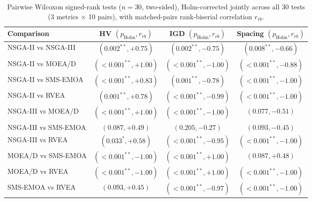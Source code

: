 \begin{table}[tbp]
\centering
\caption{Pairwise Wilcoxon signed-rank tests ($n=30$, two-sided), Holm-corrected jointly across all 30 tests (3 metrics $\times$ 10 pairs), with matched-pairs rank-biserial correlation $r_{rb}$.}
\label{tab:wilcoxon}
\small
\setlength{\tabcolsep}{4pt}
\begin{tabular}{lccc}
\toprule
Comparison & HV $(p_{\mathrm{Holm}}, r_{rb})$ & IGD $(p_{\mathrm{Holm}}, r_{rb})$ & Spacing $(p_{\mathrm{Holm}}, r_{rb})$ \\
\midrule
NSGA-II vs NSGA-III & $(0.002^{**}, +0.75)$ & $(0.002^{**}, -0.75)$ & $(0.008^{**}, -0.66)$ \\
NSGA-II vs MOEA/D & $(<0.001^{**}, +1.00)$ & $(<0.001^{**}, -1.00)$ & $(<0.001^{**}, -0.88)$ \\
NSGA-II vs SMS-EMOA & $(<0.001^{**}, +0.83)$ & $(0.001^{**}, -0.78)$ & $(<0.001^{**}, -1.00)$ \\
NSGA-II vs RVEA & $(0.001^{**}, +0.78)$ & $(<0.001^{**}, -0.99)$ & $(<0.001^{**}, -1.00)$ \\
NSGA-III vs MOEA/D & $(<0.001^{**}, +1.00)$ & $(<0.001^{**}, -1.00)$ & $(0.077, -0.51)$ \\
NSGA-III vs SMS-EMOA & $(0.087, +0.49)$ & $(0.205, -0.27)$ & $(0.093, -0.45)$ \\
NSGA-III vs RVEA & $(0.033^{*}, +0.58)$ & $(<0.001^{**}, -0.95)$ & $(<0.001^{**}, -1.00)$ \\
MOEA/D vs SMS-EMOA & $(<0.001^{**}, -1.00)$ & $(<0.001^{**}, +1.00)$ & $(0.087, +0.48)$ \\
MOEA/D vs RVEA & $(<0.001^{**}, -1.00)$ & $(<0.001^{**}, +1.00)$ & $(<0.001^{**}, -1.00)$ \\
SMS-EMOA vs RVEA & $(0.093, +0.45)$ & $(<0.001^{**}, -0.97)$ & $(<0.001^{**}, -1.00)$ \\
\bottomrule
\end{tabular}
\end{table}


